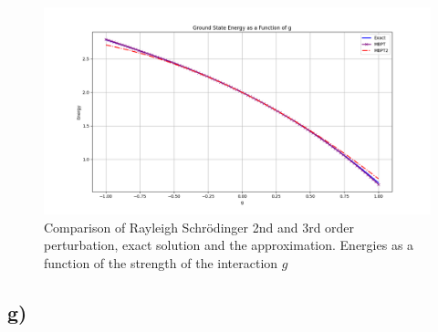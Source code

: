 \documentclass[a4paper,12pt]{article}
\begin{document}
\begin{figure}[h!]
    \centering
    \includegraphics[scale = 0.5]{Figure_8.png}
    \caption{Comparison of Rayleigh Schrödinger 2nd and 3rd order perturbation, exact solution and the approximation.
    Energies as a function of the strength of the interaction $g$}
    \label{fig:fig8}
\end{figure}
\subsection*{g)}
\end{document}
